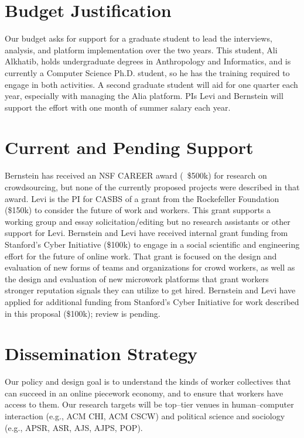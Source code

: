 \documentclass[11pt]{article}
\begin{document}
\section{Budget Justification}
Our budget asks for support for a graduate student to lead the
  interviews,
  analysis, and
  platform implementation
over the two years.
This student,
  Ali Alkhatib,
holds undergraduate degrees in
  Anthropology and
  Informatics,
and is currently a Computer Science Ph.D. student,
so he has the training required to engage in both activities.
A second graduate student will aid for one quarter each year,
especially with managing the Alia platform.
PIs Levi and Bernstein will support the effort with one month of summer salary each year.



\section{Current and Pending Support}
Bernstein has received an NSF CAREER award (~\$500k) for research on crowdsourcing,
but none of the currently proposed projects were described in that award.
Levi is the PI for CASBS of a grant from the Rockefeller Foundation (\$150k)
to consider the future of work and workers.
This grant supports a working group and essay solicitation/editing but
no research assistants or other support for Levi.
Bernstein and Levi have received internal grant funding from
Stanford's Cyber Initiative (\$100k)
to engage in a social scientific and engineering effort for the future of online work.
That grant is focused on the design and evaluation of
new forms of teams and organizations for crowd workers,
as well as the design and evaluation of new microwork platforms that grant workers stronger reputation signals they can utilize to get hired.
Bernstein and Levi have applied for additional funding from
Stanford's Cyber Initiative for work described in this proposal (\$100k);
review is pending.



\section{Dissemination Strategy}
Our policy and design goal is to understand
the kinds of worker collectives that can succeed
in an online piecework economy,
and to ensure that workers have access to them.
Our research targets will be top--tier venues in human--computer interaction
(e.g., ACM CHI, ACM CSCW)
and political science and sociology
(e.g., APSR, ASR, AJS, AJPS, POP). 
\end{document}
